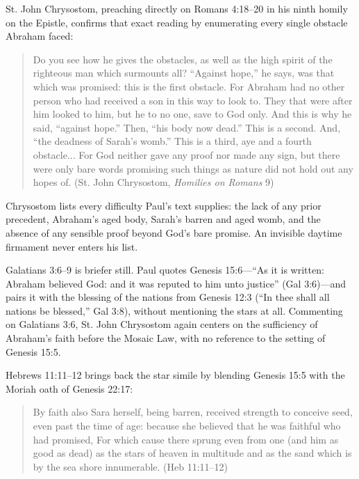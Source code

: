 St. John Chrysostom, preaching directly on Romans 4:18--20 in his ninth homily on the Epistle, confirms that exact reading by enumerating every single obstacle Abraham faced:

\begin{quote}
Do you see how he gives the obstacles, as well as the high spirit of the righteous man which surmounts all? ``Against hope,'' he says, was that which was promised: this is the first obstacle. For Abraham had no other person who had received a son in this way to look to. They that were after him looked to him, but he to no one, save to God only. And this is why he said, ``against hope.'' Then, ``his body now dead.'' This is a second. And, ``the deadness of Sarah's womb.'' This is a third, aye and a fourth obstacle... For God neither gave any proof nor made any sign, but there were only bare words promising such things as nature did not hold out any hopes of. (St. John Chrysostom, \emph{Homilies on Romans} 9)
\end{quote}

Chrysostom lists every difficulty Paul's text supplies: the lack of any prior precedent, Abraham's aged body, Sarah's barren and aged womb, and the absence of any sensible proof beyond God's bare promise. An invisible daytime firmament never enters his list.

Galatians 3:6--9 is briefer still. Paul quotes Genesis 15:6---``As it is written: Abraham believed God: and it was reputed to him unto justice'' (Gal 3:6)---and pairs it with the blessing of the nations from Genesis 12:3 (``In thee shall all nations be blessed,'' Gal 3:8), without mentioning the stars at all. Commenting on Galatians 3:6, St. John Chrysostom again centers on the sufficiency of Abraham's faith before the Mosaic Law, with no reference to the setting of Genesis 15:5.

Hebrews 11:11--12 brings back the star simile by blending Genesis 15:5 with the Moriah oath of Genesis 22:17:

\begin{quote}
By faith also Sara herself, being barren, received strength to conceive seed, even past the time of age: because she believed that he was faithful who had promised, For which cause there sprung even from one (and him as good as dead) as the stars of heaven in multitude and as the sand which is by the sea shore innumerable. (Heb 11:11--12)
\end{quote}

